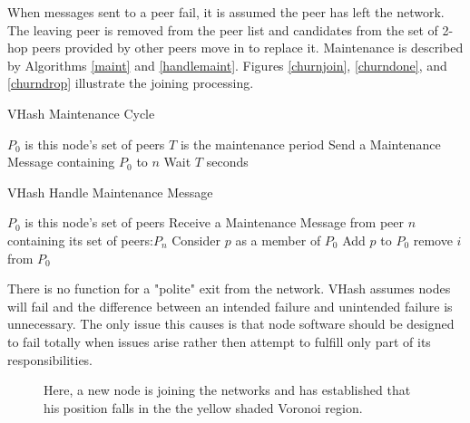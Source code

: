\documentclass{IEEEtran}
\begin{document}
When messages sent to a peer fail, it is assumed the peer has left the network. The leaving peer is removed from the peer list and candidates from the set of 2-hop peers provided by other peers move in to replace it.  Maintenance is described by Algorithms \ref{maint} and \ref{handlemaint}.  Figures \ref{churnjoin}, \ref{churndone}, and \ref{churndrop} illustrate the joining processing.

\begin{algorithm}
\caption{VHash Maintenance Cycle}
\label{maint}
\begin{algorithmic}[1]  %
	\STATE $P_0$ is this node's set of peers
    \STATE $T$ is the maintenance period
        	\STATE Send a Maintenance Message containing $P_0$ to $n$
        \ENDFOR
    \STATE Wait $T$ seconds
    \ENDWHILE
\end{algorithmic}
\end{algorithm}


\begin{algorithm}
\caption{VHash Handle Maintenance Message}
\label{handlemaint}
\begin{algorithmic}[1]  %
	\STATE $P_0$ is this node's set of peers
	\STATE Receive a Maintenance Message from peer $n$ containing its set of peers:$P_n$
    	\STATE Consider $p$ as a member of $P_0$
        	\STATE Add $p$ to $P_0$
                	\STATE remove $i$ from $P_0$
                \ENDIF
            \ENDFOR
        \ENDIF
    \ENDFOR
\end{algorithmic}
\end{algorithm}

There is no function for a "polite" exit from the network. VHash  assumes nodes will fail and the difference between an intended failure and unintended failure is unnecessary. The only issue this causes is that node software should be designed to fail totally when issues arise rather then attempt to fulfill only part of its responsibilities.  


\begin{figure}
    \caption{Here, a new node is joining the networks and has established that his position falls in the the yellow shaded Voronoi region.}
\end{figure}
\end{document}
